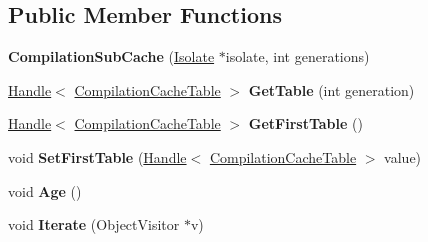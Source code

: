 \subsection*{Public Member Functions}
\begin{DoxyCompactItemize}
\item 
\hypertarget{classv8_1_1internal_1_1_compilation_sub_cache_a33089004169c56ebb3bcb3d52c17da1f}{}{\bfseries Compilation\+Sub\+Cache} (\hyperlink{classv8_1_1internal_1_1_isolate}{Isolate} $\ast$isolate, int generations)\label{classv8_1_1internal_1_1_compilation_sub_cache_a33089004169c56ebb3bcb3d52c17da1f}

\item 
\hypertarget{classv8_1_1internal_1_1_compilation_sub_cache_a022b165acb35e9396529db1b8890c12b}{}\hyperlink{classv8_1_1internal_1_1_handle}{Handle}$<$ \hyperlink{classv8_1_1internal_1_1_compilation_cache_table}{Compilation\+Cache\+Table} $>$ {\bfseries Get\+Table} (int generation)\label{classv8_1_1internal_1_1_compilation_sub_cache_a022b165acb35e9396529db1b8890c12b}

\item 
\hypertarget{classv8_1_1internal_1_1_compilation_sub_cache_ae3ea21dea1eae5c6a87757a3b22bd580}{}\hyperlink{classv8_1_1internal_1_1_handle}{Handle}$<$ \hyperlink{classv8_1_1internal_1_1_compilation_cache_table}{Compilation\+Cache\+Table} $>$ {\bfseries Get\+First\+Table} ()\label{classv8_1_1internal_1_1_compilation_sub_cache_ae3ea21dea1eae5c6a87757a3b22bd580}

\item 
\hypertarget{classv8_1_1internal_1_1_compilation_sub_cache_ae7a8d0f24eed9faee92379512444c68b}{}void {\bfseries Set\+First\+Table} (\hyperlink{classv8_1_1internal_1_1_handle}{Handle}$<$ \hyperlink{classv8_1_1internal_1_1_compilation_cache_table}{Compilation\+Cache\+Table} $>$ value)\label{classv8_1_1internal_1_1_compilation_sub_cache_ae7a8d0f24eed9faee92379512444c68b}

\item 
\hypertarget{classv8_1_1internal_1_1_compilation_sub_cache_a5cce5a7f798869e8f075334d11a04fa5}{}void {\bfseries Age} ()\label{classv8_1_1internal_1_1_compilation_sub_cache_a5cce5a7f798869e8f075334d11a04fa5}

\item 
\hypertarget{classv8_1_1internal_1_1_compilation_sub_cache_a7dd2c58e4cb9d6404b0d176ce526ad37}{}void {\bfseries Iterate} (Object\+Visitor $\ast$v)\label{classv8_1_1internal_1_1_compilation_sub_cache_a7dd2c58e4cb9d6404b0d176ce526ad37}


\end{DoxyCompactItemize}
